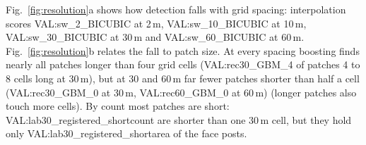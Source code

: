 Fig.~\ref{fig:resolution}a shows how detection falls with grid spacing: interpolation scores {{VAL:sw_2_BICUBIC}} at 2\,m, {{VAL:sw_10_BICUBIC}} at 10\,m, {{VAL:sw_30_BICUBIC}} at 30\,m and {{VAL:sw_60_BICUBIC}} at 60\,m. Fig.~\ref{fig:resolution}b relates the fall to patch size. At every spacing boosting finds nearly all patches longer than four grid cells ({{VAL:rec30_GBM_4}} of patches 4 to 8 cells long at 30\,m), but at 30 and 60\,m far fewer patches shorter than half a cell ({{VAL:rec30_GBM_0}} at 30\,m, {{VAL:rec60_GBM_0}} at 60\,m) (longer patches also touch more cells). By count most patches are short: {{VAL:lab30_registered_shortcount}} are shorter than one 30\,m cell, but they hold only {{VAL:lab30_registered_shortarea}} of the face posts.
